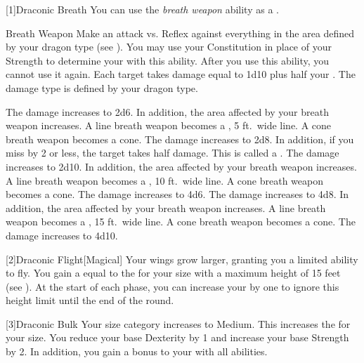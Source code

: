             [1]{Draconic Breath} You can use the \textit{breath weapon} ability as a .
            \begin{freeability}{Breath Weapon}
                Make an attack vs. Reflex against everything in the area defined by your dragon type (see ).
                You may use your Constitution in place of your Strength to determine your  with this ability.
                After you use this ability, you  cannot use it again.
                \hit Each target takes damage equal to 1d10 plus half your .
                The damage type is defined by your dragon type.

                \rankline
                 The damage increases to 2d6.
                    In addition, the area affected by your breath weapon increases.
                    A line breath weapon becomes a \arealarge, 5 ft.\ wide line.
                    A cone breath weapon becomes a \areamed cone.
                 The damage increases to 2d8.
                    In addition, if you miss by 2 or less, the target takes half damage.
                    This is called a .
                 The damage increases to 2d10.
                    In addition, the area affected by your breath weapon increases.
                    A line breath weapon becomes a \areahuge, 10 ft.\ wide line.
                    A cone breath weapon becomes a \arealarge cone.
                 The damage increases to 4d6.
                 The damage increases to 4d8.
                    In addition, the area affected by your breath weapon increases.
                    A line breath weapon becomes a \areagarg, 15 ft.\ wide line.
                    A cone breath weapon becomes a \areahuge cone.
                 The damage increases to 4d10.
            \end{freeability}

            [2]{Draconic Flight}[Magical] Your wings grow larger, granting you a limited ability to fly.
            You gain a  equal to the  for your size with a maximum height of 15 feet (see ).
            At the start of each phase, you can increase your  by one to ignore this height limit until the end of the round.

            [3]{Draconic Bulk} Your size category increases to Medium.
            This increases the  for your size.
            You reduce your base Dexterity by 1 and increase your base Strength by 2.
            In addition, you gain a  bonus to your  with all abilities.

